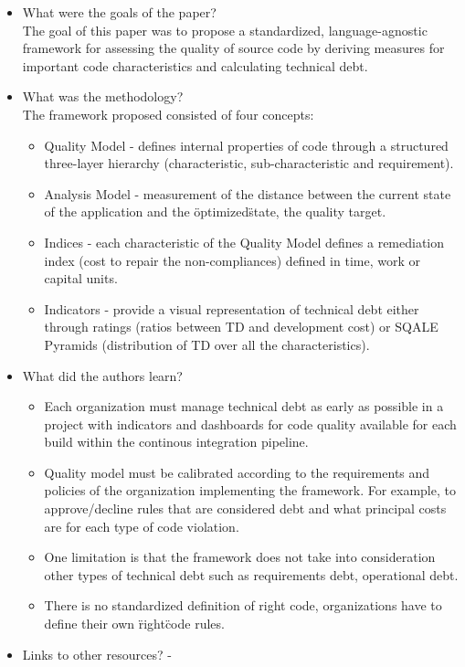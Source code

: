\documentclass{mprop}
\begin{document}
\begin{itemize}
	\item What were the goals of the paper? \\
		The goal of this paper was to propose a standardized, language-agnostic framework for assessing the quality of source code by deriving measures for important code characteristics and calculating technical debt.
	\item What was the methodology? \\
		The framework proposed consisted of four concepts:
		\begin{itemize}
			\item Quality Model - defines internal properties of code through a structured three-layer hierarchy (characteristic, sub-characteristic and requirement).
			\item Analysis Model - measurement of the distance between the current state of the application and the \"optimized\" state, the quality target.
			\item Indices - each characteristic of the Quality Model defines a remediation index (cost to repair the non-compliances) defined in time, work or capital units.
			\item Indicators - provide a visual representation of technical debt either through ratings (ratios between TD and development cost) or SQALE Pyramids (distribution of TD over all the characteristics).
		\end{itemize}
	\item What did the authors learn?
		\begin{itemize}
			\item Each organization must manage technical debt as early as possible in a project with indicators and dashboards for code quality available for each build within the continous integration pipeline.
			\item Quality model must be calibrated according to the requirements and policies of the organization implementing the framework. For example, to approve/decline rules that are considered debt and what principal costs are for each type of code violation.
			\item One limitation is that the framework does not take into consideration other types of technical debt such as requirements debt, operational debt.
			\item There is no standardized definition of right code, organizations have to define their own \"right\" code rules.
		\end{itemize}
	\item Links to other resources?
		-
\end{itemize}
\end{document}
